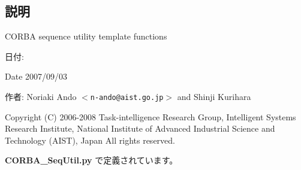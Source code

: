 \subsection{説明}
CORBA sequence utility template functions 

\begin{Desc}
\item[日付:]\end{Desc}
\begin{Desc}
\item[Date]2007/09/03 \end{Desc}
\begin{Desc}
\item[作者:]Noriaki Ando $<${\tt n-ando@aist.go.jp}$>$ and Shinji Kurihara\end{Desc}
Copyright (C) 2006-2008 Task-intelligence Research Group, Intelligent Systems Research Institute, National Institute of Advanced Industrial Science and Technology (AIST), Japan All rights reserved. 

 {\bf CORBA\_\-SeqUtil.py} で定義されています。